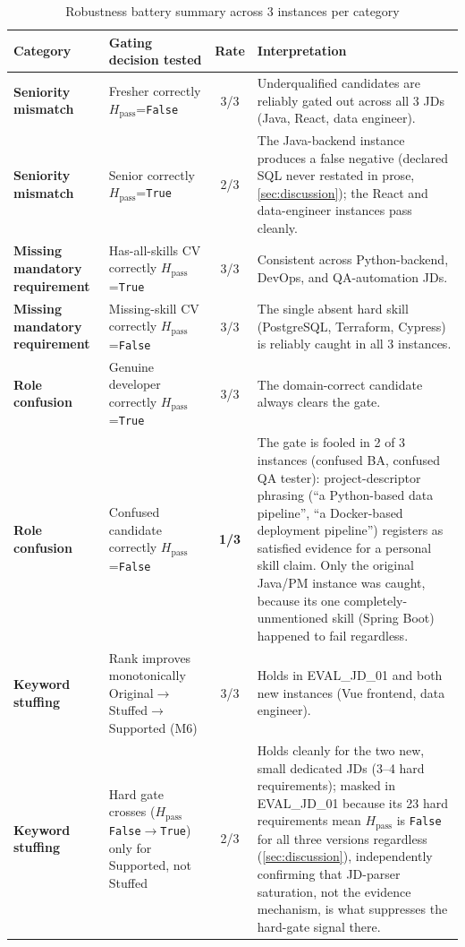 \documentclass[12pt,a4paper,oneside]{report}
\begin{document}
\begin{table}[htbp]
\centering
\caption{Robustness battery summary across 3 instances per category}
\label{tab:battery-summary}
\begin{tabularx}{\textwidth}{>{\bfseries}p{}p{}cX}
\toprule
Category & Gating decision tested & Rate & Interpretation \\
\midrule
Seniority mismatch & Fresher correctly $H_{\mathrm{pass}}$=\texttt{False} & 3/3 & Underqualified candidates are reliably gated out across all 3 JDs (Java, React, data engineer). \\
Seniority mismatch & Senior correctly $H_{\mathrm{pass}}$=\texttt{True} & 2/3 & The Java-backend instance produces a false negative (declared SQL never restated in prose, \cref{sec:discussion}); the React and data-engineer instances pass cleanly. \\
Missing mandatory requirement & Has-all-skills CV correctly $H_{\mathrm{pass}}$=\texttt{True} & 3/3 & Consistent across Python-backend, DevOps, and QA-automation JDs. \\
Missing mandatory requirement & Missing-skill CV correctly $H_{\mathrm{pass}}$=\texttt{False} & 3/3 & The single absent hard skill (PostgreSQL, Terraform, Cypress) is reliably caught in all 3 instances. \\
Role confusion & Genuine developer correctly $H_{\mathrm{pass}}$=\texttt{True} & 3/3 & The domain-correct candidate always clears the gate. \\
Role confusion & Confused candidate correctly $H_{\mathrm{pass}}$=\texttt{False} & \textbf{1/3} & The gate is fooled in 2 of 3 instances (confused BA, confused QA tester): project-descriptor phrasing (``a Python-based data pipeline'', ``a Docker-based deployment pipeline'') registers as satisfied evidence for a personal skill claim. Only the original Java/PM instance was caught, because its one completely-unmentioned skill (Spring Boot) happened to fail regardless. \\
Keyword stuffing & Rank improves monotonically Original$\to$Stuffed$\to$Supported (M6) & 3/3 & Holds in EVAL\_JD\_01 and both new instances (Vue frontend, data engineer). \\
Keyword stuffing & Hard gate crosses ($H_{\mathrm{pass}}$ \texttt{False}$\to$\texttt{True}) only for Supported, not Stuffed & 2/3 & Holds cleanly for the two new, small dedicated JDs (3--4 hard requirements); masked in EVAL\_JD\_01 because its 23 hard requirements mean $H_{\mathrm{pass}}$ is \texttt{False} for all three versions regardless (\cref{sec:discussion}), independently confirming that JD-parser saturation, not the evidence mechanism, is what suppresses the hard-gate signal there. \\
\bottomrule
\end{tabularx}
\end{table}
\end{document}
